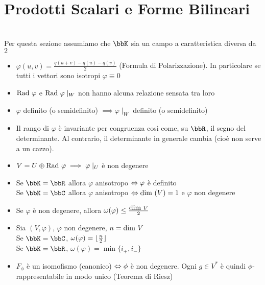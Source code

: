 \documentclass[a4paper,NoNotes,GeneralMath]{stdmdoc}
\begin{document}
	\section*{Prodotti Scalari e Forme Bilineari}
	\Achtung \\ Per questa sezione assumiamo che $\bbK$ sia un campo a caratteristica diversa da $2$
	\begin{itemize}
		\item $\varphi(u,v) = \frac{q(u+v)-q(u)-q(v)}{2}$ (Formula di Polarizzazione). In particolare se tutti i vettori sono isotropi $\varphi \equiv 0$
		\item $\mbox{Rad }\varphi$ e $\mbox{Rad }\varphi\mid_W$ non hanno alcuna relazione sensata tra loro
		\item $\varphi$ definito (o semidefinito) $\implies \varphi\mid_W$ definito (o semidefinito)
		\item Il rango di $\varphi$ è invariante per congruenza così come, su $\bbR$, il segno del determinante. Al contrario, il determinante in generale cambia (cioè non serve a un cazzo).
		\item $V = U \oplus \mbox{Rad }\varphi \implies \varphi\mid_U$ è non degenere
		\item Se $\bbK = \bbR$ allora $\varphi$ anisotropo $\Leftrightarrow \varphi$ è definito \\ Se $\bbK = \bbC$ allora $\varphi$ anisotropo $\Leftrightarrow \mbox{dim }(V) = 1$ e $\varphi$ non degenere
	\end{itemize}
	\begin{itemize}
		\item Se $\varphi$ è non degenere, allora $\omega(\varphi) \le \frac{\mbox{dim } V}{2}$
		\item Sia $(V, \varphi)$, $\varphi$ non degenere, $n = \mbox{dim } V$ \\ Se $\bbK = \bbC$, $\omega(\varphi) = \lfloor \frac{n}{2} \rfloor$ \\ Se $\bbK = \bbR$, $\omega(\varphi) = \min\{i_{+}, i_{-}\}$
		\item $F_\phi$ è un isomofismo (canonico) $\Leftrightarrow \phi$ è non degenere. Ogni $g \in V^{*}$ è quindi $\phi$-rappresentabile in modo unico (Teorema di Riesz)
	\end{itemize}
\end{document}
